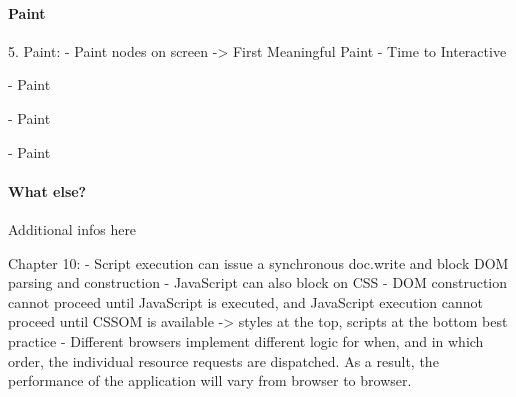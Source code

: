 




\paragraph{Paint}




5. Paint:
- Paint nodes on screen
-> First Meaningful Paint
- Time to Interactive


- Paint



- Paint


- Paint








\paragraph{What else?}

Additional infos here








Chapter 10:
- Script execution can issue a synchronous doc.write and block DOM parsing and construction
- JavaScript can also block on CSS
- DOM construction cannot proceed until JavaScript is executed, and JavaScript execution cannot proceed until CSSOM is available
-> styles at the top, scripts at the bottom best practice
- Different browsers implement different logic for when, and in which order, the individual resource requests are dispatched. As a result, the performance of the application will vary from browser to browser.


